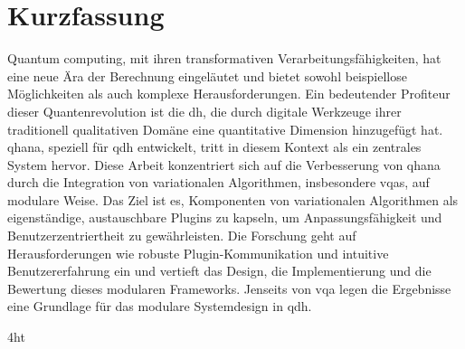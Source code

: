 \documentclass[
  a4paper,  %
  twoside,  %
  bibliography=totoc,
  headsepline,
  cleardoublepage=empty,
  parskip=half,
  draft=false
]{scrbook}
\begin{document}
\section*{Kurzfassung}
Quantum computing, mit ihren transformativen Verarbeitungsfähigkeiten, hat eine neue Ära der Berechnung eingeläutet und bietet sowohl beispiellose Möglichkeiten als auch komplexe Herausforderungen.
Ein bedeutender Profiteur dieser Quantenrevolution ist die \gls{dh}, die durch digitale Werkzeuge ihrer traditionell qualitativen Domäne eine quantitative Dimension hinzugefügt hat.
\gls{qhana}, speziell für \gls{qdh} entwickelt, tritt in diesem Kontext als ein zentrales System hervor.
Diese Arbeit konzentriert sich auf die Verbesserung von \gls{qhana} durch die Integration von variationalen Algorithmen, insbesondere \glspl{vqa}, auf modulare Weise.
Das Ziel ist es, Komponenten von variationalen Algorithmen als eigenständige, austauschbare Plugins zu kapseln, um Anpassungsfähigkeit und Benutzerzentriertheit zu gewährleisten.
Die Forschung geht auf Herausforderungen wie robuste Plugin-Kommunikation und intuitive Benutzererfahrung ein und vertieft das Design, die Implementierung und die Bewertung dieses modularen Frameworks.
Jenseits von \gls{vqa} legen die Ergebnisse eine Grundlage für das modulare Systemdesign in \gls{qdh}.

\cleardoublepage



\iftex4ht
\else
\fi

%
%

%
%
%
\tableofcontents


\listoffigures
\listoftables

\lstlistoflistings
\end{document}
